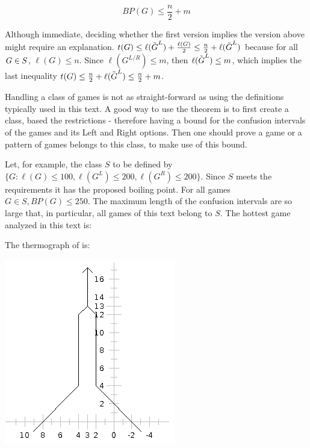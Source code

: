 $$
BP(G) \leq \frac{n}{2} + m
$$

Although immediate, deciding whether the first version implies the version above might require an explanation. $t(G) \leq \ell(\tilde{\mbox{$G$}}^L) + \frac{\ell(G)}{2} \leq \frac{n}{2} + \ell(\tilde{\mbox{$G$}}^L)$ because for all \mbox{$\mbox{$G$} \in S$}, \mbox{$\ell(G) \leq n$}. Since $\ell(G^{L/R}) \leq m$, then $\ell(\tilde{\mbox{$G$}}^L) \leq m$, which implies the last inequality \mbox{$t(G) \leq \frac{n}{2} + \ell(\tilde{\mbox{$G$}}^L) \leq \frac{n}{2} + m$}.

Handling a class of games is not as straight-forward as using the definitions typically used in this text. A good way to use the theorem is to first create a class, based the restrictions - therefore having a bound for the confusion intervals of the games and its Left and Right options. Then one should prove a game or a pattern of games belongs to this class, to make use of this bound.

Let, for example, the class $S$ to be defined by $\{G : \ell(G)\leq100, \ell(G^L)\leq200, \ell(G^R)\leq200\}$. Since $S$ meets the requirements it has the proposed boiling point. For all games $G \in S, BP(G) \leq 250$. The maximum length of the confusion intervals are so large that, in particular, all games of this text belong to $S$. The hottest game \Gm{} analyzed in this text is:

\begin{center}
\end{center}

The thermograph of  is:
\begin{center}
	\includegraphics[scale=0.5]{../images/thermA.png}
\end{center}

